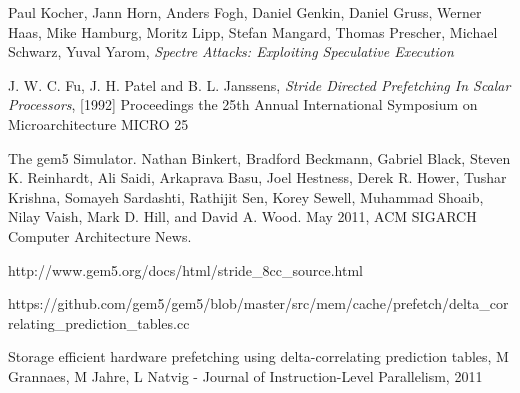 \documentclass[twoside]{iitbreport}
\begin{document}
\begin{thebibliography}{99}
Paul Kocher, Jann Horn, Anders Fogh, Daniel Genkin, Daniel Gruss, Werner Haas, Mike Hamburg, Moritz Lipp, Stefan Mangard, Thomas Prescher, Michael Schwarz, Yuval Yarom, {\it Spectre Attacks: Exploiting Speculative Execution}

J. W. C. Fu, J. H. Patel and B. L. Janssens, {\it Stride Directed Prefetching In Scalar Processors}, [1992] Proceedings the 25th Annual International Symposium on Microarchitecture MICRO 25

The gem5 Simulator. Nathan Binkert, Bradford Beckmann, Gabriel Black, Steven K. Reinhardt, Ali Saidi, Arkaprava Basu, Joel Hestness, Derek R. Hower, Tushar Krishna, Somayeh Sardashti, Rathijit Sen, Korey Sewell, Muhammad Shoaib, Nilay Vaish, Mark D. Hill, and David A. Wood. May 2011, ACM SIGARCH Computer Architecture News.

http://www.gem5.org/docs/html/stride\_8cc\_source.html

https://github.com/gem5/gem5/blob/master/src/mem/cache/prefetch/delta\_correlating\_prediction\_tables.cc

Storage efficient hardware prefetching using delta-correlating prediction tables, M Grannaes, M Jahre, L Natvig - Journal of Instruction-Level Parallelism, 2011
\end{thebibliography}

%



\end{document}
